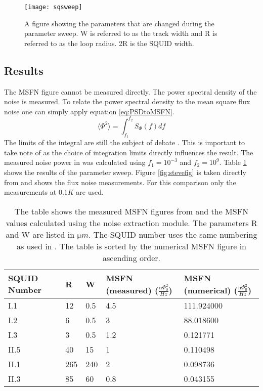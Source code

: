 \begin{figure}[H]
    \centering
    \texttt{[image: sqsweep]}
    \caption{A figure showing the parameters that are changed during the parameter sweep. W is referred to as the track width and R is referred to as the loop radius. 2R is the SQUID width.}
    \label{fig:sqsweep}
\end{figure}
\subsection{Results}
The MSFN figure cannot be measured directly. The power spectral density of the noise is measured. To relate the power spectral density to the mean square flux noise one can simply apply equation \ref{eq:PSDtoMSFN}.
\begin{equation}
    \langle \Phi^2 \rangle = \int_{f_1}^{f_2}S_\Phi (f) df
    \label{eq:PSDtoMSFN}
\end{equation} 
The limits of the integral are still the subject of debate \cite{fluxNoiseSquidsStevenAnton}. This is important to take note of as the choice of integration limits directly influences the result. The measured noise power in \cite{fluxNoiseSquidsStevenAnton} was calculated using $f_1 = 10^{-3}$ and $f_2 = 10^9$. Table \ref{tab:sweepres} shows the results of the parameter sweep. Figure \ref{fig:stevefig} is taken directly from \cite{fluxNoiseSquidsStevenAnton} and shows the flux noise measurements. For this comparison only the measurements at $0.1 K$ are used. 
\begin{table}[H]
    \centering   
    \begin{tabular}{lllll}
        \hline
        SQUID Number & R & W & MSFN (measured) ($\frac{\si{\nano}\Phi_0^2}{Hz}$) & MSFN (numerical) ($\frac{\si{\nano}\Phi_0^2}{Hz}$)\\ \hline
        I.1 & 12 & 0.5 & 4.5 & 111.924000 \\
        I.2 & 6 & 0.5 & 3 & 88.018600 \\
        I.3 & 3 & 0.5 & 1.2 & 0.121771 \\
        II.5 & 40 & 15 & 1 & 0.110498 \\
        II.1 & 265 & 240 & 2 & 0.098736 \\
        II.3 & 85 & 60 & 0.8 & 0.043155 \\ \hline
    \end{tabular}
    \caption{The table shows the measured MSFN figures from \cite{fluxNoiseSquidsStevenAnton} and the MSFN values calculated using the noise extraction module. The parameters R and W are listed in $\si{\micro m}$. The SQUID number uses the same numbering as used in \cite{fluxNoiseSquidsStevenAnton}. The table is sorted by the numerical MSFN figure in ascending order.}
    \label{tab:sweepres}
\end{table}


